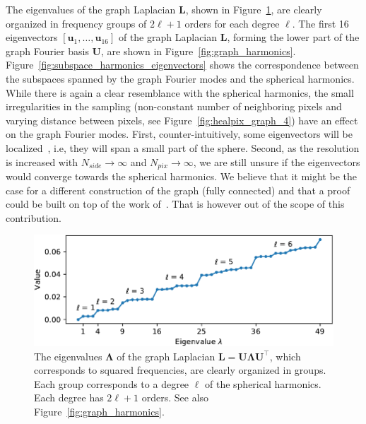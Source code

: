 \documentclass[final,twocolumn,3p,times,authoryear]{elsarticle}
\newcommand{\figref}[1]{Figure~\ref{fig:#1}}
\renewcommand{\b}[1]{{\bm{#1}}}   %
\newcommand{\1}{\b{1}}              %
\newcommand{\0}{\b{0}}              %
\renewcommand{\L}{\b{L}}
\newcommand{\U}{\b{U}}
\newcommand{\trans}{^\intercal}
\newcommand{\bLambda}{\b{\Lambda}}
\begin{document}
The eigenvalues of the graph Laplacian $\L$, shown in \figref{graph_eigenvalues}, are clearly organized in frequency groups of $2\ell + 1$ orders for each degree $\ell$.
The first 16 eigenvectors $[\b u_1, \ldots, \b u_{16}]$ of the graph Laplacian $\L$, forming the lower part of the graph Fourier basis $\U$, are shown in \figref{graph_harmonics}. \figref{subspace_harmonics_eigenvectors} shows the correspondence between the subspaces spanned by the graph Fourier modes and the spherical harmonics. While there is again a clear resemblance with the spherical harmonics, the small irregularities in the sampling (non-constant number of neighboring pixels and varying distance between pixels, see \figref{healpix_graph_4}) have an effect on the graph Fourier modes.
First, counter-intuitively, some eigenvectors will be localized~\citep{perraudin2018global}, i.e, they will span a small part of the sphere.
Second, as the resolution is increased with $N_{side} \rightarrow \infty$ and $N_{pix} \rightarrow \infty$, we are still unsure if the eigenvectors would converge towards the spherical harmonics. We believe that it might be the case for a different construction of the graph (fully connected) and that a proof could be built on top of the work of~\cite{belkin2007convergence}. That is however out of the scope of this contribution.

\begin{figure}
	\centering
	\includegraphics[width=\linewidth]{graph_eigenvalues}
	\caption{The eigenvalues $\bLambda$ of the graph Laplacian $\L = \U \bLambda \U\trans$, which corresponds to squared frequencies, are clearly organized in groups. Each group corresponds to a degree $\ell$ of the spherical harmonics. Each degree has $2\ell + 1$ orders. See also \figref{graph_harmonics}.}
	\label{fig:graph_eigenvalues}
\end{figure}
\end{document}
